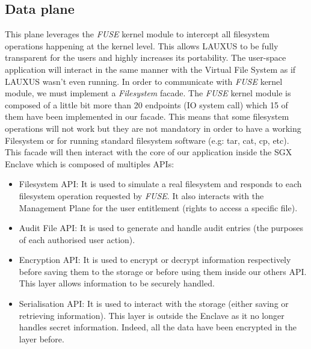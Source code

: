 \documentclass[../main.tex]{subfiles}
\begin{document}
\subsection{Data plane}
\label{section:lauxus:architecture_dataplane}
\par This plane leverages the \textit{FUSE} kernel module to intercept all filesystem operations happening at the kernel level. This allows LAUXUS to be fully transparent for the users and highly increases its portability. The user-space application will interact in the same manner with the Virtual File System as if LAUXUS wasn't even running. In order to communicate with \textit{FUSE} kernel module, we must implement a \textit{Filesystem} facade. The \textit{FUSE} kernel module is composed of a little bit more than 20 endpoints (IO system call) which 15 of them have been implemented in our facade. This means that some filesystem operations will not work but they are not mandatory in order to have a working Filesystem or for running standard filesystem software (e.g: tar, cat, cp, etc). This facade will then interact with the core of our application inside the SGX Enclave which is composed of multiples APIs:
\begin{itemize}
    \item Filesystem API: It is used to simulate a real filesystem and responds to each filesystem operation requested by \textit{FUSE}. It also interacts with the Management Plane for the user entitlement (rights to access a specific file).
    \item Audit File API: It is used to generate and handle audit entries (the purposes of each authorised user action).
    \item Encryption API: It is used to encrypt or decrypt information respectively before saving them to the storage or before using them inside our others API. This layer allows information to be securely handled.
    \item Serialisation API: It is used to interact with the storage (either saving or retrieving information). This layer is outside the Enclave as it no longer handles secret information. Indeed, all the data have been encrypted in the layer before.
\end{itemize}
\end{document}
